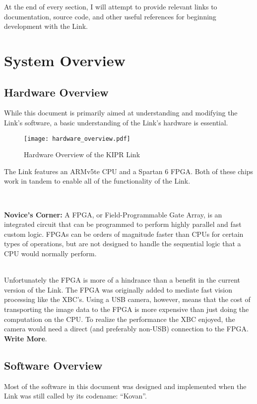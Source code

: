 \documentclass[12pt,letterpaper]{article}
\newcommand{\bcolorbox}[4]{\noindent \\ \fcolorbox{#1}{#2} {\parbox{\textwidth}{\vspace{.1em}\textbf{#3} #4\vspace{.1em}}} \\}
\newcommand{\novice}[1]{\bcolorbox{green}{Honeydew}{Novice's Corner:}{#1}}
\begin{document}
	At the end of every section, I will attempt to provide relevant links to documentation, source code, and other useful references
	for beginning development with the Link.
	
	\section{System Overview}
	
	\subsection{Hardware Overview}
	
	While this document is primarily aimed at understanding and modifying the Link's software, a basic understanding of
	the Link's hardware is essential.
	
	\begin{figure}[H]
		\begin{center}
			\texttt{[image: hardware\_overview.pdf]}
			\caption{Hardware Overview of the KIPR Link}
		\end{center}
	\end{figure}
	
	The Link features an ARMv5te CPU and a Spartan 6 FPGA. Both of these chips work in tandem to enable all of the functionality
	of the Link.
	
	\novice{A FPGA, or Field-Programmable Gate Array, is an integrated circuit that can be programmed to perform highly parallel and fast
	custom logic. FPGAs can be orders of magnitude faster than CPUs for certain types of operations, but are not designed to handle the
	sequential logic that a CPU would normally perform.}
	
	Unfortunately the FPGA is more of a hindrance than a benefit in the current version of the Link. The FPGA was originally added to
	mediate fast vision processing like the XBC's. Using a USB camera, however, means that the cost of transporting the image data to the
	FPGA is more expensive than just doing the computation on the CPU. To realize the performance the XBC enjoyed, the camera would need
	a direct (and preferably non-USB) connection to the FPGA. \textbf{Write More}.
	
	\subsection{Software Overview}
	
	Most of the software in this document was designed and implemented when the Link was still called by its codename: ``Kovan''.
	
\end{document}
